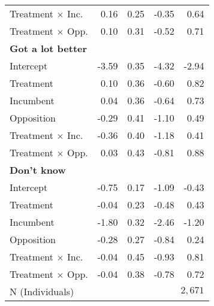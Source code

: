 \begin{table}
\begin{tabular}[t]{l D{.}{.}{-1} D{.}{.}{-1} D{.}{.}{-1} D{.}{.}{-1} }
\textsf{Treatment $\times$ Inc.} & 0.16 & 0.25 & -0.35 & 0.64\\
\textsf{Treatment $\times$ Opp.} & 0.10 & 0.31 & -0.52 & 0.71\\
\textsf{\textbf{Got a lot better}} &  &  &  & \\
\textsf{Intercept} & -3.59 & 0.35 & -4.32 & -2.94\\
\textsf{Treatment} & 0.10 & 0.36 & -0.60 & 0.82\\
\textsf{Incumbent} & 0.04 & 0.36 & -0.64 & 0.73\\
\textsf{Opposition} & -0.29 & 0.41 & -1.10 & 0.49\\
\textsf{Treatment $\times$ Inc.} & -0.36 & 0.40 & -1.18 & 0.41\\
\textsf{Treatment $\times$ Opp.} & 0.03 & 0.43 & -0.81 & 0.88\\
\textsf{\textbf{Don't know}} &  &  &  & \\
\textsf{Intercept} & -0.75 & 0.17 & -1.09 & -0.43\\
\textsf{Treatment} & -0.04 & 0.23 & -0.48 & 0.43\\
\textsf{Incumbent} & -1.80 & 0.32 & -2.46 & -1.20\\
\textsf{Opposition} & -0.28 & 0.27 & -0.84 & 0.24\\
\textsf{Treatment $\times$ Inc.} & -0.04 & 0.45 & -0.93 & 0.81\\
\textsf{Treatment $\times$ Opp.} & -0.04 & 0.38 & -0.78 & 0.72\\
\midrule
\textsf{N (Individuals)} & \\
\bottomrule
\end{tabular}
\end{table}